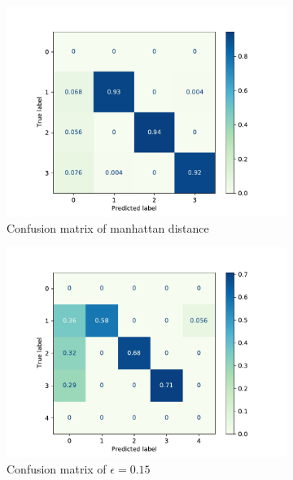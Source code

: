 \begin{figure}[h]
	
	\begin{subfigure}{0.33\textwidth}
		\centering
		\includegraphics[width=\linewidth]{figures/4-cm_bolb}
		\caption{Confusion matrix of manhattan distance}
		\label{fig:p2-4}
	\end{subfigure}
	\begin{subfigure}{0.33\textwidth}
		\centering
		\includegraphics[width=\linewidth]{figures/5-cm-epsilon}  
		\caption{Confusion matrix of $\epsilon = 0.15$  }
		\label{fig:p2-5}
	\end{subfigure}
	\begin{subfigure}{0.33\textwidth}
		\centering

\end{subfigure}
\end{figure}
